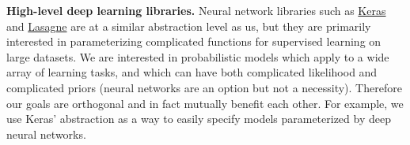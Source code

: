\textbf{High-level deep learning libraries.}
Neural network libraries such as
\href{https://github.com/fchollet/keras}{Keras} and
\href{https://github.com/Lasagne/Lasagne}{Lasagne} are at a similar
abstraction level as us, but they are primarily interested in
parameterizing complicated functions for supervised learning on large
datasets. We are interested in probabilistic models which apply
to a wide array of learning tasks, and which can have both
complicated likelihood and complicated priors (neural networks are an
option but not a necessity). Therefore our goals are orthogonal and in
fact mutually benefit each other. For example, we use Keras'
abstraction as a way to easily specify models parameterized by deep
neural networks.
